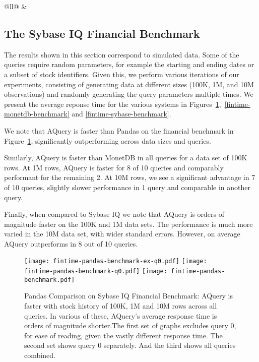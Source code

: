 \documentclass{acm_proc_article-sp}
\begin{document}
\begin{table}[]
{\begin{tabular}{@{}ll@{}}
 &                                                                                                                                                                        \\ \bottomrule
\end{tabular}
}
\caption{Financial Queries Description}
\label{fintime-description}
\end{table}


\subsection{The Sybase IQ Financial Benchmark}
The results shown in this section correspond to simulated data. Some of the queries require
random parameters, for example the starting and ending dates or a subset of stock identifiers. Given this, we perform
various iterations of our experiments, consisting of generating data at different sizes (100K, 1M, and 10M observations) and randomly generating the query parameters multiple times. We present the average reponse time for the
various systems in Figures~\ref{fintime-pandas-benchmark},~\ref{fintime-monetdb-benchmark} and \ref{fintime-sybase-benchmark}.

We note that AQuery is faster than Pandas on the financial benchmark in Figure~\ref{fintime-pandas-benchmark}, significantly outperforming across data sizes and queries. 

Similarly, AQuery is faster than MonetDB in all queries for a data set of 100K rows. At 1M rows, AQuery is faster for 8 of 10 queries and comparably performant for the remaining 2. At 10M rows, we see a significant advantage
in 7 of 10 queries, slightly slower performance in 1 query and comparable in another query.

Finally, when compared to Sybase IQ we note that AQuery is orders of magnitude faster on the 100K
and 1M data sets. The performance is much more varied in  the 10M data set, with wider standard errors. However, on average AQuery outperforms in 8 out of 10 queries.


\begin{figure}
\texttt{[image: fintime-pandas-benchmark-ex-q0.pdf]}
\texttt{[image: fintime-pandas-benchmark-q0.pdf]}
\texttt{[image: fintime-pandas-benchmark.pdf]}
\caption{Pandas Comparison on Sybase IQ Financial Benchmark: AQuery is faster with stock history of
100K, 1M and 10M rows across all queries. In various of these, AQuery's average response time is orders of magnitude shorter.The first set of graphs excludes query 0, for ease of reading, given the vastly different response time. The second set shows query 0 separately. And the third shows all queries combined.}
\label{fintime-pandas-benchmark}
\end{figure}
\end{document}
